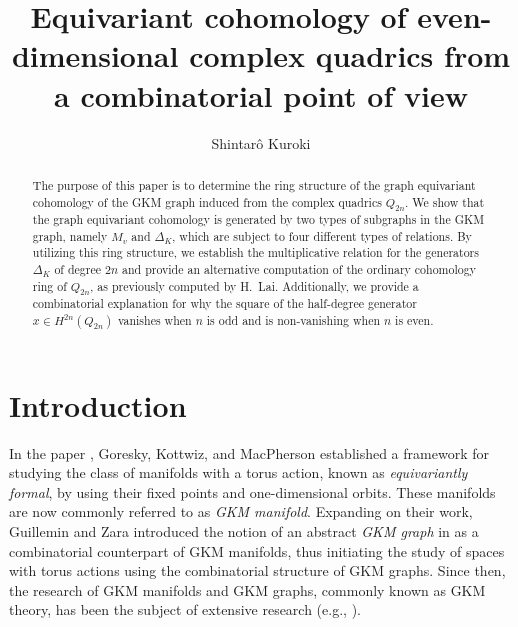 \documentclass[12pt]{amsart}
\theoremstyle{remark}
\numberwithin{equation}{section}
\begin{document}
\title[Equivariant cohomology of even-dimensional complex quadrics]{Equivariant cohomology of even-dimensional complex quadrics from a combinatorial point of view}

\author[S.\ Kuroki]{Shintar\^o Kuroki}
\address{Department of Applied Mathematics Faculty of Science, Okayama University of Science, 1-1 Ridai-Cho Kita-Ku Okayama-shi Okayama 700-0005, Okayama, Japan}



\begin{abstract}
The purpose of this paper is to determine the ring structure of the graph equivariant cohomology of the GKM graph induced from the complex quadrics $Q_{2n}$.
We show that the graph equivariant cohomology is generated by two types of subgraphs in the GKM graph, namely $M_{v}$ and $\Delta_{K}$, 
which are subject to four different types of relations.
By utilizing this ring structure, we establish the multiplicative relation for the generators $\Delta_{K}$ of degree $2n$ and provide an alternative computation of the ordinary cohomology ring of $Q_{2n}$, as previously computed by H.~Lai.
Additionally, we provide a combinatorial explanation for why the square of the half-degree generator $x\in H^{2n}(Q_{2n})$ vanishes when $n$ is odd and is non-vanishing when $n$ is even.
\end{abstract}

\maketitle

\section{Introduction}
\label{sect:1}

In the paper \cite{GKM}, Goresky, Kottwiz, and MacPherson 
established a framework for studying the class of manifolds with a torus action, known as {\it equivariantly formal}, 
by using their fixed points and one-dimensional orbits. 
These manifolds are now commonly referred to as {\it GKM manifold}.
Expanding on their work, Guillemin and Zara introduced the notion of an abstract {\it GKM graph} in \cite{GZ01} as a combinatorial counterpart of GKM manifolds, thus initiating the study of spaces with torus actions using the combinatorial structure of GKM graphs.
Since then, 
the research of GKM manifolds and GKM graphs, commonly known as GKM theory, has been the subject of extensive research (e.g., \cite{GHZ, GKZ, GSZ,  Ku16, Ku19, MMP}).
\end{document}
